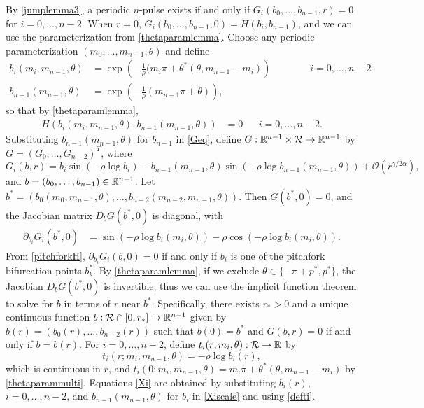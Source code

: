 \documentclass[12pt]{elsarticle}
\theoremstyle{plain}
\theoremstyle{definition}
\theoremstyle{remark}
\numberwithin{theorem}{section}
\numberwithin{equation}{section}
\begin{document}
By \cref{jumplemma3}, a periodic $n$-pulse exists if and only if $G_i(b_0, \dots, b_{n-1}, r) = 0$ for $i = 0, \dots, n-2$. When $r = 0$, $G_i(b_0, \dots, b_{n-1}, 0) = H(b_i, b_{n-1})$, and we can use the parameterization from \cref{thetaparamlemma}. Choose any periodic parameterization $(m_0, \dots, m_{n-1}, \theta)$ and define
\begin{equation}\label{thetaparammulti}
\begin{aligned}
b_i( m_i, m_{n-1}, \theta) &= \exp\left( -\frac{1}{\rho}(m_i \pi + \theta^*(\theta, m_{n-1} - m_i) \right) \qquad\qquad i = 0, \dots, n-2 \\
b_{n-1}( m_{n-1}, \theta) &= \exp\left( -\frac{1}{\rho}(m_{n-1} \pi + \theta) \right),
\end{aligned}
\end{equation}
so that by \cref{thetaparamlemma},
\begin{align*}
H(b_i( m_i, m_{n-1}, \theta), b_{n-1}( m_{n-1}, \theta) ) &= 0 && i = 0, \dots, n-2.
\end{align*}
Substituting $b_{n-1}(m_{n-1}, \theta)$ for $b_{n-1}$ in \cref{Geq}, define $G: \mathbb{R}^{n-1} \times \mathcal{R} \rightarrow \mathbb{R}^{n-1}$ by $G = (G_0, \dots, G_{n-2})^T$, where 
\begin{equation*}
G_i(b, r) = b_i \sin \left( -\rho \log b_i \right) - b_{n-1}(m_{n-1}, \theta) \sin \left( -\rho \log b_{n-1}(m_{n-1}, \theta) \right) + \mathcal{O}(r^{\gamma / 2 \alpha}),
\end{equation*}
and $b = (b_0, \dots, b_{n-1}) \in \mathbb{R}^{n-1}$. Let $b^* = (b_0( m_0, m_{n-1}, \theta), \dots, b_{n-2}( m_{n-2}, m_{n-1}, \theta) )$. Then $G(b^*, 0) = 0$, and the Jacobian matrix $D_b G(b^*,0)$ is diagonal, with
\begin{align*}
\partial_{b_i} G_i(b^*, 0)
&= \sin \left( -\rho \log b_i(m_i, \theta) \right) - \rho \cos \left( -\rho \log b_i(m_i, \theta) \right).
\end{align*}
From \cref{pitchforkH}, $\partial_{b_i} G_i(b, 0) = 0$ if and only if $b_i$ is one of the pitchfork bifurcation points $b_k^*$. By \cref{thetaparamlemma}, if we exclude $\theta \in \{ -\pi + p^*, p^* \}$, the Jacobian $D_b G(b^*,0)$ is invertible, thus we can use the implicit function theorem to solve for $b$ in terms of $r$ near $b^*$. Specifically, there exists $r_* > 0$ and a unique continuous function $b: \mathcal{R} \cap [0, r_*] \rightarrow \mathbb{R}^{n-1}$ given by $b(r) = \left( b_0(r), \dots, b_{n-2}(r) \right)$ such that $b(0) = b^*$ and $G(b,r) = 0$ if and only if $b = b(r)$. For $i = 0, \dots, n-2$, define $t_i(r; m_i, \theta): \mathcal{R} \rightarrow \mathbb{R}$ by
\begin{equation}\label{defti}
t_i(r; m_i, m_{n-1}, \theta) = -\rho \log b_i(r),
\end{equation}
which is continuous in $r$, and $t_i(0; m_i, m_{n-1}, \theta) = m_i \pi + \theta^*(\theta, m_{n-1} - m_i)$ by \cref{thetaparammulti}. Equations \cref{Xi} are obtained by substituting $b_i(r)$, $i = 0, \dots, n-2$, and $b_{n-1}(m_{n-1}, \theta)$ for $b_i$ in \cref{Xiscale} and using \cref{defti}.
\end{document}
